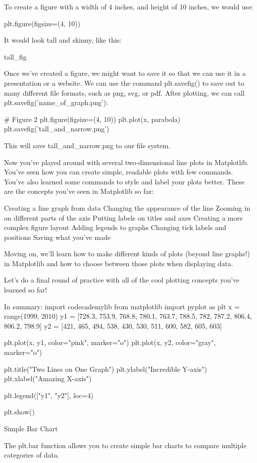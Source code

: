 \documentclass{journal}
\begin{document}
To create a figure with a width of 4 inches, and height of 10 inches, we would use:

plt.figure(figsize=(4, 10))

It would look tall and skinny, like this:

tall_fig

Once we’ve created a figure, we might want to save it so that we can use it in a presentation or a website. We can use the command plt.savefig() to save out to many different file formats, such as png, svg, or pdf. After plotting, we can call plt.savefig('name_of_graph.png'):

# Figure 2
plt.figure(figsize=(4, 10)) 
plt.plot(x, parabola)
plt.savefig('tall_and_narrow.png')

This will save tall_and_narrow.png to our file system.


Now you’ve played around with several two-dimensional line plots in Matplotlib. You’ve seen how you can create simple, readable plots with few commands. You’ve also learned some commands to style and label your plots better. These are the concepts you’ve seen in Matplotlib so far:

    Creating a line graph from data
    Changing the appearance of the line
    Zooming in on different parts of the axis
    Putting labels on titles and axes
    Creating a more complex figure layout
    Adding legends to graphs
    Changing tick labels and positions
    Saving what you’ve made

Moving on, we’ll learn how to make different kinds of plots (beyond line graphs!) in Matplotlib and how to choose between those plots when displaying data.

Let’s do a final round of practice with all of the cool plotting concepts you’ve learned so far!

In summary:
import codecademylib
from matplotlib import pyplot as plt
x = range(1999, 2010)
y1 = [728.3, 753.9, 768.8, 780.1, 763.7, 788.5, 782, 787.2, 806.4, 806.2, 798.9]
y2 = [421, 465, 494, 538, 430, 530, 511, 600, 582, 605, 603]

plt.plot(x, y1, color="pink", marker="o")
plt.plot(x, y2, color="gray", marker="o")

plt.title("Two Lines on One Graph")
plt.ylabel("Incredible Y-axis")
plt.xlabel("Amazing X-axis")

plt.legend(["y1", "y2"], loc=4)

plt.show()

Simple Bar Chart

The plt.bar function allows you to create simple bar charts to compare multiple categories of data.
\end{document}
